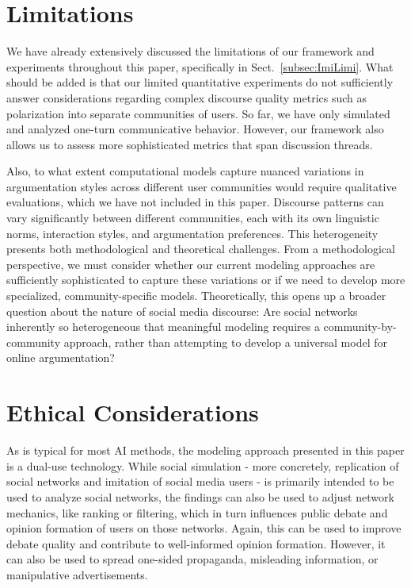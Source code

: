 \section*{Limitations}
We have already extensively discussed the limitations of our framework and experiments throughout this paper, specifically in Sect.~\ref{subsec:ImiLimi}. What should be added is that our limited quantitative experiments do not sufficiently answer considerations regarding complex discourse quality metrics such as polarization into separate communities of users. So far, we have only simulated and analyzed one-turn communicative behavior. However, our framework also allows us to assess more sophisticated metrics that span discussion threads. 

Also, to what extent computational models capture nuanced variations in argumentation styles across different user communities would require qualitative evaluations, which we have not included in this paper. Discourse patterns can vary significantly between different communities, each with its own linguistic norms, interaction styles, and argumentation preferences. This heterogeneity presents both methodological and theoretical challenges. From a methodological perspective, we must consider whether our current modeling approaches are sufficiently sophisticated to capture these variations or if we need to develop more specialized, community-specific models. Theoretically, this opens up a broader question about the nature of social media discourse: Are social networks inherently so heterogeneous that meaningful modeling requires a community-by-community approach, rather than attempting to develop a universal model for online argumentation?

\section*{Ethical Considerations}
As is typical for most AI methods, the modeling approach presented in this paper is a dual-use technology. While social simulation - more concretely, replication of social networks and imitation of social media users - is primarily intended to be used to analyze social networks, the findings can also be used to adjust network mechanics, like ranking or filtering, which in turn influences public debate and opinion formation of users on those networks. Again, this can be used to improve debate quality and contribute to well-informed opinion formation. However, it can also be used to spread one-sided propaganda, misleading information, or manipulative advertisements.

